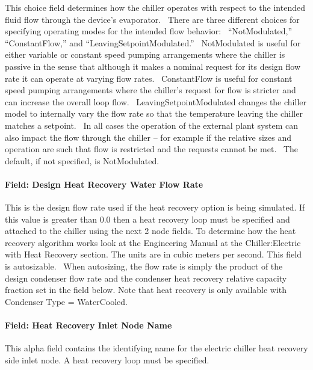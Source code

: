 This choice field determines how the chiller operates with respect to the intended fluid flow through the device's evaporator.~ There are three different choices for specifying operating modes for the intended flow behavior:~ ``NotModulated,'' ``ConstantFlow,'' and ``LeavingSetpointModulated.''~ NotModulated is useful for either variable or constant speed pumping arrangements where the chiller is passive in the sense that although it makes a nominal request for its design flow rate it can operate at varying flow rates.~ ConstantFlow is useful for constant speed pumping arrangements where the chiller's request for flow is stricter and can increase the overall loop flow.~ LeavingSetpointModulated changes the chiller model to internally vary the flow rate so that the temperature leaving the chiller matches a setpoint.~ In all cases the operation of the external plant system can also impact the flow through the chiller -- for example if the relative sizes and operation are such that flow is restricted and the requests cannot be met.~ The default, if not specified, is NotModulated.

\paragraph{Field: Design Heat Recovery Water Flow Rate}\label{field-design-heat-recovery-water-flow-rate-000}

This is the design flow rate used if the heat recovery option is being simulated. If this value is greater than 0.0 then a heat recovery loop must be specified and attached to the chiller using the next 2 node fields. To determine how the heat recovery algorithm works look at the Engineering Manual at the Chiller:Electric with Heat Recovery section. The units are in cubic meters per second. This field is autosizable.~ When autosizing, the flow rate is simply the product of the design condenser flow rate and the condenser heat recovery relative capacity fraction set in the field below. Note that heat recovery is only available with Condenser Type = WaterCooled.

\paragraph{Field: Heat Recovery Inlet Node Name}\label{field-heat-recovery-inlet-node-name-000}

This alpha field contains the identifying name for the electric chiller heat recovery side inlet node. A heat recovery loop must be specified.


